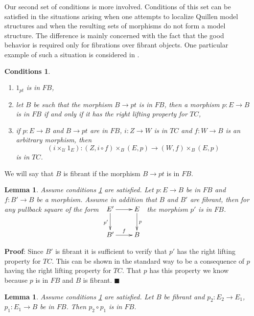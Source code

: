 \documentclass[12pt]{article}
\numberwithin{equation}{section}
\newenvironment{myproof}{{\bf Proof}:}{$\blacksquare$ \vskip 5mm }
\newtheorem{lemma}[proposition]{Lemma}
\newtheorem{cond}[proposition]{Conditions}
\newcommand{\sr}{\rightarrow}
\newcommand{\id}{1}            %
\newcommand{\U}{\mathcal{U}}
\begin{document}
Our second set of conditions is more involved. Conditions of this set can be
satisfied in the situations arising when one attempts to localize Quillen model
structures and when the resulting sets of morphisms do not form a model
structure. The difference is mainly concerned with the fact that the good
behavior is required only for fibrations over fibrant objects. One particular
example of such a situation is considered in \cite[Section 3.3]{SRF}.

%
\begin{cond}\label{2015.05.22.cond1}
%
\begin{enumerate}
\item $\id_{pt}$ is in $FB$,
\item let $B$ be such that the morphism $B\sr pt$ is in $FB$, then a morphism
  $p:E\sr B$ is in $FB$ if and only if it has the right lifting property for
  $TC$,
\item if $p:E\sr B$ and $B\sr pt$ are in $FB$, $i:Z\sr W$ is in $TC$ and
  $f:W\sr B$ is an arbitrary morphism, then
%
$$(i\times_\U \id_E):(Z,i\circ f)\times_B (E,p)\sr (W,f)\times_B (E,p)$$
%
is in $TC$.
%
\end{enumerate}
\end{cond}
%
We will say that $B$ is fibrant if the morphism $B\sr pt$ is in $FB$.
%
\begin{lemma}
  \label{2015.05.14.l2}
  Assume conditions \ref{2015.05.22.cond1} are satisfied.
Let $p:E\sr B$ be in $FB$ and $f:B'\sr B$ be a
morphism. Assume in addition that $B$ and $B'$ are fibrant, then for any
pullback square of the form
%
$
\begin{xy}
          \xymatrix@C=2pc{ E' \ar[r] \ar[d]_{p'} & E \ar[d]^{p}\\ B'
            \ar[r]^-{f} & B }
\end{xy}
$
%
the morphism $p'$ is in $FB$.
\end{lemma}
%
\begin{myproof}
Since $B'$ is fibrant it is sufficient to verify that $p'$ has the right
lifting property for $TC$. This can be shown in the standard way to be a
consequence of $p$ having the right lifting property for $TC$. That $p$ has
this property we know because $p$ is in $FB$ and $B$ is fibrant.
\end{myproof}
%
\begin{lemma}
  \label{2015.05.14.l4}
  Assume conditions \ref{2015.05.22.cond1} are satisfied.
  Let $B$ be fibrant and $p_2:E_2\sr E_1$, $p_1:E_1\sr B$
  be in $FB$. Then $p_2\circ p_1$ is in $FB$.
\end{lemma}
\end{document}
